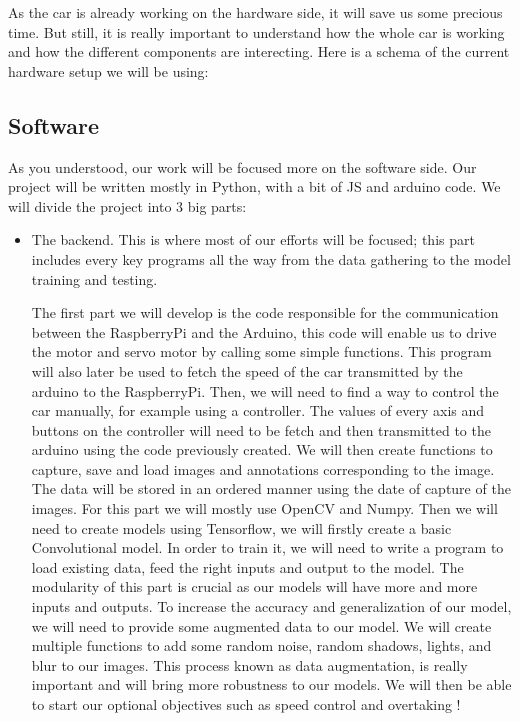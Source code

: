 \documentclass[12pt]{article}
\begin{document}
As the car is already working on the hardware side, it will save us some precious time. But still, it is really important to understand how the whole car is working and how the different components are interecting.
Here is a schema of the current hardware setup we will be using:
\newpage



\subsection{Software}
As you understood, our work will be focused more on the software side.
Our project will be written mostly in Python, with a bit of JS and arduino code.
We will divide the project into 3 big parts:
\begin{itemize}
\item The backend. This is where most of our efforts will be focused; this part includes every key programs all the way from the data gathering to the model training and testing.

The first part we will develop is the code responsible for the communication between the RaspberryPi and the Arduino, this code will enable us to drive the motor and servo motor by calling some simple functions. This program will also later be used to fetch the speed of the car transmitted by the arduino to the RaspberryPi.
Then, we will need to find a way to control the car manually, for example using a controller. The values of every axis and buttons on the controller will need to be fetch and then transmitted to the arduino using the code previously created.
We will then create functions to capture, save and load images and annotations corresponding to the image. The data will be stored in an ordered manner using the date of capture of the images. For this part we will mostly use OpenCV and Numpy.
Then we will need to create models using Tensorflow, we will firstly create a basic Convolutional model. In order to train it, we will need to write a program to load existing data, feed the right inputs and output to the model. The modularity of this part is crucial as our models will have more and more inputs and outputs.
To increase the accuracy and generalization of our model, we will need to provide some augmented data to our model. We will create multiple functions to add some random noise, random shadows, lights, and blur to our images. This process known as data augmentation, is really important and will bring more robustness to our models.
We will then be able to start our optional objectives such as speed control and overtaking !


\end{itemize}
\end{document}
